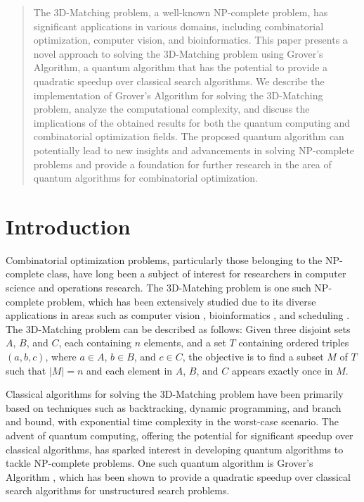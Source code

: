 \begin{abstract}
The 3D-Matching problem, a well-known NP-complete problem, has significant applications in various domains, including combinatorial optimization, computer vision, and bioinformatics. This paper presents a novel approach to solving the 3D-Matching problem using Grover's Algorithm, a quantum algorithm that has the potential to provide a quadratic speedup over classical search algorithms. We describe the implementation of Grover's Algorithm for solving the 3D-Matching problem, analyze the computational complexity, and discuss the implications of the obtained results for both the quantum computing and combinatorial optimization fields. The proposed quantum algorithm can potentially lead to new insights and advancements in solving NP-complete problems and provide a foundation for further research in the area of quantum algorithms for combinatorial optimization.
\end{abstract}

\section{Introduction}

Combinatorial optimization problems, particularly those belonging to the NP-complete class, have long been a subject of interest for researchers in computer science and operations research. The 3D-Matching problem is one such NP-complete problem, which has been extensively studied due to its diverse applications in areas such as computer vision \cite{computer_vision}, bioinformatics \cite{bioinformatics}, and scheduling \cite{scheduling}. The 3D-Matching problem can be described as follows: Given three disjoint sets $A$, $B$, and $C$, each containing $n$ elements, and a set $T$ containing ordered triples $(a, b, c)$, where $a \in A$, $b \in B$, and $c \in C$, the objective is to find a subset $M$ of $T$ such that $|M| = n$ and each element in $A$, $B$, and $C$ appears exactly once in $M$.

Classical algorithms for solving the 3D-Matching problem have been primarily based on techniques such as backtracking, dynamic programming, and branch and bound, with exponential time complexity in the worst-case scenario. The advent of quantum computing, offering the potential for significant speedup over classical algorithms, has sparked interest in developing quantum algorithms to tackle NP-complete problems. One such quantum algorithm is Grover's Algorithm \cite{grover}, which has been shown to provide a quadratic speedup over classical search algorithms for unstructured search problems.

